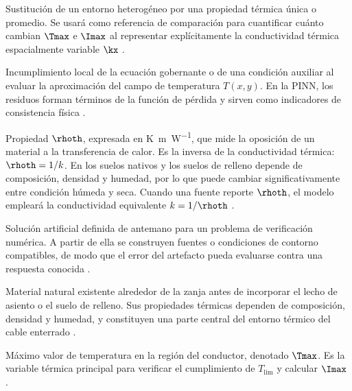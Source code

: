 \begin{description}[style=nextline,itemsep=0.5\baselineskip,parsep=0pt,topsep=0.25\baselineskip]
  \item[Representación homogénea equivalente.] Sustitución de un entorno heterogéneo por una propiedad térmica única o promedio. Se usará como referencia de comparación para cuantificar cuánto cambian $\Tmax$ e $\Imax$ al representar explícitamente la conductividad térmica espacialmente variable $\kx$ \parencites{farouki1981thermal,devries1966thermal}[4--6]{enescu2021}[3--4,41--42,93--99]{cigre2025}.

  \item[Residuo físico.] Incumplimiento local de la ecuación gobernante o de una condición auxiliar al evaluar la aproximación del campo de temperatura $T(x,y)$. En la PINN, los residuos forman términos de la función de pérdida y sirven como indicadores de consistencia física \parencites[686--690]{raissi2019}[1--2,14--17]{lawal2022}.

  \item[Resistividad térmica.] Propiedad $\rhoth$, expresada en \si{\kelvin\metre\per\watt}, que mide la oposición de un material a la transferencia de calor. Es la inversa de la conductividad térmica: $\rhoth=1/k$. En los suelos nativos y los suelos de relleno depende de composición, densidad y humedad, por lo que puede cambiar significativamente entre condición húmeda y seca. Cuando una fuente reporte $\rhoth$, el modelo empleará la conductividad equivalente $k=1/\rhoth$ \parencites{farouki1981thermal,devries1966thermal}[1,6--9]{khumalo2025}[secciones 4--6]{ieee442}.

  \item[Solución manufacturada.] Solución artificial definida de antemano para un problema de verificación numérica. A partir de ella se construyen fuentes o condiciones de contorno compatibles, de modo que el error del artefacto pueda evaluarse contra una respuesta conocida \parencites{cigre2022}[93--99]{cigre2025}.

  \item[Suelo nativo.] Material natural existente alrededor de la zanja antes de incorporar el lecho de asiento o el suelo de relleno. Sus propiedades térmicas dependen de composición, densidad y humedad, y constituyen una parte central del entorno térmico del cable enterrado \parencites{farouki1981thermal,devries1966thermal}[1,6--9]{khumalo2025}[secciones 4--6]{ieee442}.

  \item[Temperatura máxima del conductor.] Máximo valor de temperatura en la región del conductor, denotado $\Tmax$. Es la variable térmica principal para verificar el cumplimiento de $T_{\mathrm{lim}}$ y calcular $\Imax$ \parencites[752--760]{neher1957}{anders2005}[cláusulas 4--5]{iec60287}[3--6]{enescu2021}.


\end{description}
